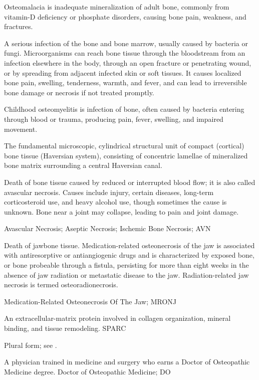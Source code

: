  Osteomalacia is inadequate mineralization of adult bone, commonly from vitamin-D deficiency or phosphate disorders, causing bone pain, weakness, and fractures.

 A serious infection of the bone and bone marrow, usually caused by bacteria or fungi. Microorganisms can reach bone tissue through the bloodstream from an infection elsewhere in the body, through an open fracture or penetrating wound, or by spreading from adjacent infected skin or soft tissues. It causes localized bone pain, swelling, tenderness, warmth, and fever, and can lead to irreversible bone damage or necrosis if not treated promptly.

 Childhood osteomyelitis is infection of bone, often caused by bacteria entering through blood or trauma, producing pain, fever, swelling, and impaired movement.

 The fundamental microscopic, cylindrical structural unit of compact (cortical) bone tissue (Haversian system), consisting of concentric lamellae of mineralized bone matrix surrounding a central Haversian canal.

 Death of bone tissue caused by reduced or interrupted blood flow; it is
also called avascular necrosis. Causes include injury, certain diseases, long-term corticosteroid
use, and heavy alcohol use, though sometimes the cause is unknown. Bone near a joint may collapse,
leading to pain and joint damage.

\synonyms
Avascular Necrosis; Aseptic Necrosis; Ischemic Bone Necrosis; AVN

 Death of jawbone tissue. Medication-related
osteonecrosis of the jaw is associated with antiresorptive or antiangiogenic drugs
and is characterized by exposed bone, or bone probeable through a fistula,
persisting for more than eight weeks in the absence of jaw radiation or metastatic
disease to the jaw. Radiation-related jaw necrosis is termed osteoradionecrosis.

\synonyms
Medication-Related Osteonecrosis Of The Jaw; MRONJ

 An extracellular-matrix protein involved in collagen organization, mineral binding, and tissue remodeling.
\synonyms
SPARC

 Plural form; see .

 A physician trained in medicine and surgery who earns a Doctor of Osteopathic Medicine degree.
\synonyms
Doctor of Osteopathic Medicine; DO

